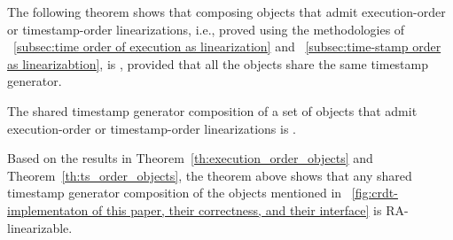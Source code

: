 The following theorem shows that composing \crdtlinearizable{} objects that admit execution-order or timestamp-order linearizations, i.e., proved using the methodologies of \sectionautorefname~\ref{subsec:time order of execution as linearization} and \sectionautorefname~\ref{subsec:time-stamp order as linearizabtion}, is \crdtlinearizable{}, provided that all the objects share the same timestamp generator.

\begin{theorem}\label{th:comp_all}
The shared timestamp generator composition of a set of \crdtlinearizable{} objects that admit execution-order or timestamp-order linearizations is \crdtlinearizable{}.
\end{theorem}
\vspace{-5pt}

Based on the results in Theorem~\ref{th:execution_order_objects} and Theorem~\ref{th:ts_order_objects}, the theorem above shows that any shared timestamp generator composition of the objects mentioned in \figureautorefname~\ref{fig:crdt-implementaton of this paper, their correctness, and their interface} is RA-linearizable.

% 

